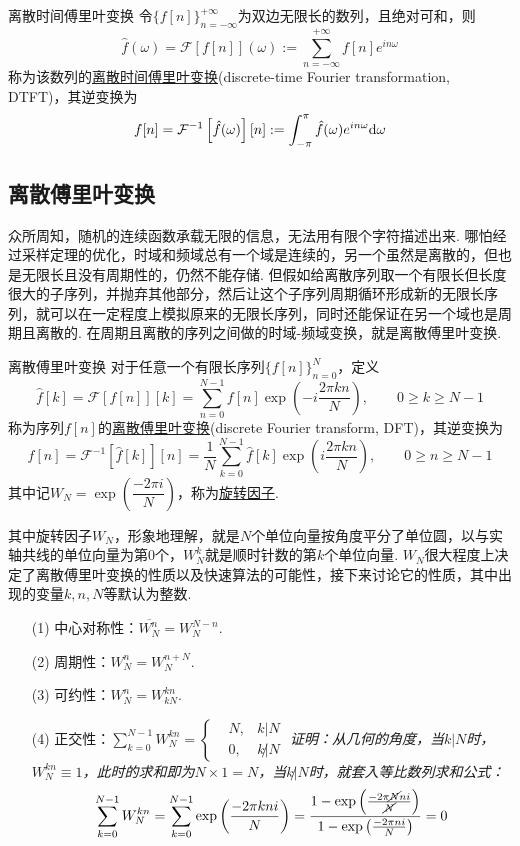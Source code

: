 \documentclass[main.tex]{subfiles}
\begin{document}
\begin{definition}{离散时间傅里叶变换}
    令\(\{f[n]\}_{n=-\infty}^{+\infty}\)为双边无限长的数列，且绝对可和，则
    \[\hat{f}(\omega)=\mathcal{F}\left[f[n]\right](\omega):=\sum_{n=-\infty}^{+\infty}f[n]e^{in\omega}\]
    称为该数列的\uline{离散时间傅里叶变换}(discrete-time Fourier transformation, DTFT)，其逆变换为
    \[f[n]=\mathcal{F}^{-1}\left[\hat{f}(\omega)\right][n]:=\int_{-\pi}^{\pi}\hat{f}(\omega)e^{in\omega}{\rm d}\omega\] 
\end{definition}

\subsection{离散傅里叶变换}

众所周知，随机的连续函数承载无限的信息，无法用有限个字符描述出来. 哪怕经过采样定理的优化，时域和频域总有一个域是连续的，另一个虽然是离散的，但也是无限长且没有周期性的，仍然不能存储. 但假如给离散序列取一个有限长但长度很大的子序列，并抛弃其他部分，然后让这个子序列周期循环形成新的无限长序列，就可以在一定程度上模拟原来的无限长序列，同时还能保证在另一个域也是周期且离散的. 在周期且离散的序列之间做的时域-频域变换，就是离散傅里叶变换.

\begin{definition}{离散傅里叶变换}
    对于任意一个有限长序列\(\{f[n]\}_{n=0}^{N}\)，定义
    \[\hat{f}[k]=\mathcal{F}[f[n]][k] = \sum_{n=0}^{N-1}f[n]\exp\left(-i\frac{2\pi kn}{N}\right), \qquad 0 \geq k \geq N-1\]
    称为序列\(f[n]\)的\uline{离散傅里叶变换}(discrete Fourier transform, DFT)，其逆变换为
    \[f[n] = \mathcal{F}^{-1}\left[\hat{f}[k]\right][n] = \frac{1}{N}\sum_{k=0}^{N-1}\hat{f}[k]\exp\left(i\frac{2\pi kn}{N}\right), \qquad 0 \geq n \geq N-1\]
    其中记\(W_{N}=\exp\left(\dfrac{-2\pi i}{N}\right)\)，称为\uline{旋转因子}.
\end{definition}

其中旋转因子\(W_{N}\)，形象地理解，就是\(N\)个单位向量按角度平分了单位圆，以与实轴共线的单位向量为第\(0\)个，\(W_N^k\)就是顺时针数的第\(k\)个单位向量. \(W_N\)很大程度上决定了离散傅里叶变换的性质以及快速算法的可能性，接下来讨论它的性质，其中出现的变量\(k,n,N\)等默认为整数.
\begin{itemize}
    \item [(1)] 中心对称性：\(\overline{W_N^n}=W_N^{N-n}\).
    \item [(2)] 周期性：\(W_N^n=W_N^{n+N}\).
    \item [(3)] 可约性：\(W_N^n=W_{kN}^{kn}\).
    \item [(4)] 正交性：\(\displaystyle{\sum_{k=0}^{N-1}W_N^{kn}=\left\{\begin{aligned} &N,&k|N \\ &0,&k\not | N\end{aligned}\right.}\)
    \newline
    \textit{
        证明：从几何的角度，当\(k|N\)时，\(W_N^{kn}\equiv 1\)，此时的求和即为\(N\times 1=N\)，当\(k\not|N\)时，就套入等比数列求和公式：
        \[\sum_{k=0}^{N-1}W_N^{kn}=\sum_{k=0}^{N-1}\exp\left(\frac{-2\pi kni}{N}\right)=\frac{1-\exp\left(\frac{-2\pi \cancel{N} ni}{\cancel N}\right)}{1-\exp\left(\frac{-2\pi ni}{N}\right)}=0\]
    }
\end{itemize}
\end{document}
